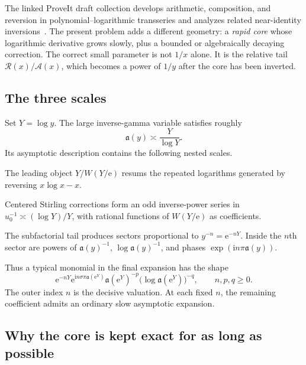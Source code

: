 \documentclass[11pt,a4paper]{article}
\numberwithin{equation}{section}
\theoremstyle{definition}
\theoremstyle{remark}
\newcommand{\e}{\mathrm e}
\newcommand{\ii}{\mathrm i}
\newcommand{\Core}{\mathcal A}
\newcommand{\InvCore}{\mathfrak a}
\newcommand{\Res}{\mathcal R}
\begin{document}
The linked ProveIt draft collection develops arithmetic, composition, and
reversion in polynomial--logarithmic transseries and analyzes related
near-identity inversions~\cite{ProveItSeries}.  The present problem adds a
different geometry: a
\emph{rapid core} whose logarithmic derivative grows slowly, plus a bounded
or algebraically decaying correction.  The correct small parameter is not
$1/x$ alone.  It is the relative tail $\Res(x)/\Core(x)$, which becomes a
power of $1/y$ after the core has been inverted.

\subsection{The three scales}

Set $Y=\log y$.  The large inverse-gamma variable satisfies roughly
\[
  \InvCore(y)\asymp \frac{Y}{\log Y}.
\]
Its asymptotic description contains the following nested scales.

\begin{description}[leftmargin=2.5em,style=nextline]
\item[Lambert scale.]
The leading object $Y/W(Y/\e)$ resums the repeated logarithms generated by
reversing $x\log x-x$.

\item[Stirling scale.]
Centered Stirling corrections form an odd inverse-power series in
$u_0^{-1}\asymp (\log Y)/Y$, with rational functions of $W(Y/\e)$ as
coefficients.

\item[Bell sectors.]
The subfactorial tail produces sectors proportional to
$y^{-n}=\e^{-nY}$.  Inside the $n$th sector are powers of
$\InvCore(y)^{-1}$, $\log\InvCore(y)^{-1}$, and phases
$\exp(\ii n\pi\InvCore(y))$.
\end{description}

Thus a typical monomial in the final expansion has the shape
\begin{equation}\label{eq:typical-monomial}
 \e^{-nY}\e^{\ii n\sigma\pi\InvCore(\e^Y)}
 \InvCore(\e^Y)^{-p}
 \bigl(\log\InvCore(\e^Y)\bigr)^{-q},
 \qquad n,p,q\ge0.
\end{equation}
The outer index $n$ is the decisive valuation.  At each fixed $n$, the
remaining coefficient admits an ordinary slow asymptotic expansion.

\subsection{Why the core is kept exact for as long as possible}
\end{document}
